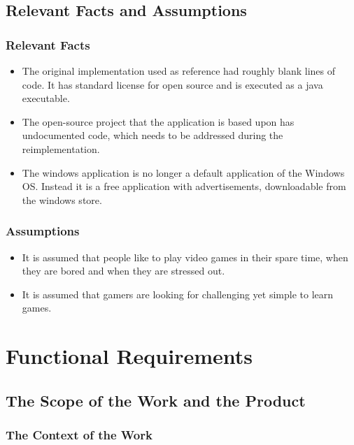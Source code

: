 \documentclass[12pt, titlepage]{article}
\begin{document}
\vspace{10mm}

\subsection{Relevant Facts and Assumptions}
\subsubsection{Relevant Facts}
\begin{itemize}
	\item The original implementation used as reference had roughly blank lines of code. It has standard 
	license for open source and is executed as a java executable.
	\item The open-source project that the application is based upon has undocumented code, which needs 
	to be addressed during the reimplementation.
	\item The windows application is no longer a default application of the Windows OS. Instead it is a free 
	application with advertisements, downloadable from the windows store.
\end{itemize}

\subsubsection{Assumptions}
\begin{itemize}
	\item It is assumed that people like to play video games in their spare time, when they are bored and 
	when they are stressed out.
	\item It is assumed that gamers are looking for challenging yet simple to learn games.
\end{itemize}

\newpage
\section{Functional Requirements}

\subsection{The Scope of the Work and the Product}

\subsubsection{The Context of the Work}
\end{document}
